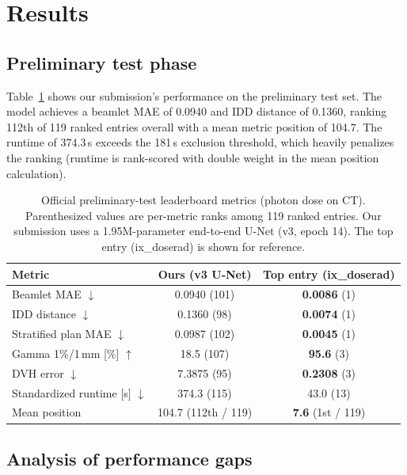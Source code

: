 \documentclass[runningheads]{llncs}
\begin{document}
\section{Results}

\subsection{Preliminary test phase}

Table~\ref{tab:lb} shows our submission's performance on the preliminary test set. The model achieves a beamlet MAE of 0.0940 and IDD distance of 0.1360, ranking 112th of 119 ranked entries overall with a mean metric position of 104.7. The runtime of 374.3\,s exceeds the 181\,s exclusion threshold, which heavily penalizes the ranking (runtime is rank-scored with double weight in the mean position calculation).

\begin{table}[t]
\centering
\caption{Official preliminary-test leaderboard metrics (photon dose on CT). Parenthesized values are per-metric ranks among 119 ranked entries. Our submission uses a 1.95M-parameter end-to-end U-Net (v3, epoch 14). The top entry (ix\_doserad) is shown for reference.}
\label{tab:lb}
\setlength{\tabcolsep}{4pt}
\begin{tabular}{lcc}
\toprule
Metric & Ours (v3 U-Net) & Top entry (ix\_doserad)\\
\midrule
Beamlet MAE $\downarrow$ & 0.0940 (101) & \textbf{0.0086} (1)\\
IDD distance $\downarrow$ & 0.1360 (98) & \textbf{0.0074} (1)\\
Stratified plan MAE $\downarrow$ & 0.0987 (102) & \textbf{0.0045} (1)\\
Gamma 1\%/1\,mm [\%] $\uparrow$ & 18.5 (107) & \textbf{95.6} (3)\\
DVH error $\downarrow$ & 7.3875 (95) & \textbf{0.2308} (3)\\
Standardized runtime [s] $\downarrow$ & 374.3 (115) & 43.0 (13)\\
\midrule
Mean position & 104.7 (112th / 119) & \textbf{7.6} (1st / 119)\\
\bottomrule
\end{tabular}
\end{table}

\subsection{Analysis of performance gaps}
\end{document}
